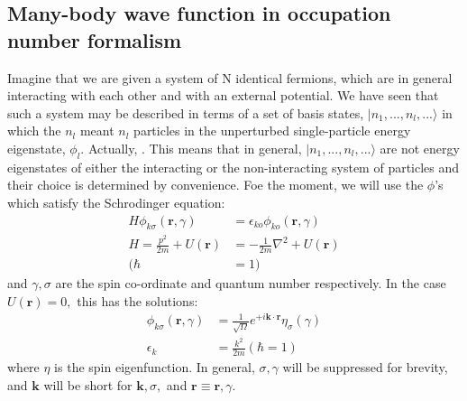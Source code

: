 \subsection{Many-body wave function in occupation number formalism}
Imagine that we are given a system of N identical fermions, which are in general interacting with each other and with an external potential. We have seen that such a system may be described in terms of a set of basis states, $|n_1,...,n_l,...\rangle$ in which the $n_l$ meant $n_l$ particles in the unperturbed single-particle energy eigenstate, $\phi_l$. Actually, . This means that in general, $|n_1,...,n_l,...\rangle$ are not energy eigenstates of either the interacting or the non-interacting system of particles and their choice is determined by convenience. Foe the moment, we will use the $\phi$'s which satisfy the Schrodinger equation:
\begin{equation}\begin{aligned}
H \phi_{k \sigma}(\mathbf{r}, \gamma) &=\epsilon_{k o} \phi_{k o}(\mathbf{r}, \gamma) \\
H=\frac{p^{2}}{2 m}+U(\mathbf{r}) &=-\frac{1}{2 m} \nabla^{2}+U(\mathbf{r}) \\
(\hbar&=1)
\end{aligned}\end{equation}
and $\gamma, \sigma$ are the spin co-ordinate and quantum number respectively. In the case $U(\mathbf{r})=0,$ this has the solutions:
\begin{equation}\begin{aligned}
\phi_{k \sigma}(\mathbf{r}, \gamma) &=\frac{1}{\sqrt{\Omega}} e^{+i \mathbf{k} \cdot \mathbf{r}} \eta_{\sigma}(\gamma) \\
\epsilon_{k} &=\frac{k^{2}}{2 m}(\hbar=1)
\end{aligned}\end{equation}
where $\eta$ is the spin eigenfunction. In general, $\sigma, \gamma$ will be suppressed for brevity, and $\mathbf{k}$ will be short for $\mathbf{k}, \sigma,$ and $\mathbf{r} \equiv \mathbf{r}, \gamma$. 


